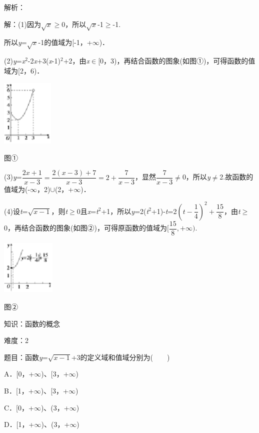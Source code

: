 \documentclass{article} %
\begin{document}
解析：

解：(1)因为$\sqrt{x}$$\mathrm{\ge}$0，所以$\sqrt{x}$-1$\mathrm{\ge}$-1.

所以\textit{y}=$\sqrt{x}$-1的值域为[-1，+$\mathrm{\infty}$)．



(2)\textit{y}=\textit{x}${}^{2}$-2\textit{x}+3(\textit{x}-1)${}^{2}$+2，由\textit{x}$\mathrm{\in}$[0，3)，再结合函数的图象(如图①)，可得函数的值域为[2，6)．

\includegraphics*[width=0.98in, height=1.27in, keepaspectratio=false]{image19}

图①

(3)\textit{y}=$\dfrac{2x+1}{x-3}=\dfrac{2(x-3)+7}{x-3}=2+\dfrac{7}{x-3}$，显然$\dfrac{7}{x-3}$$\mathrm{\neq}$0，所以\textit{y}$\mathrm{\neq}$2.故函数的值域为(-$\mathrm{\infty}$，2)$\mathrm{\cup}$(2，+$\mathrm{\infty}$)．

(4)设\textit{t}=$\sqrt{x-1}$，则\textit{t}$\mathrm{\ge}$0且\textit{x}=\textit{t}${}^{2}$+1，所以\textit{y}=2(\textit{t}${}^{2}$+1)-\textit{t}=2$(t-\dfrac{1}{4})^{2}+\dfrac{15}{8}$，由\textit{t}$\mathrm{\ge}$0，再结合函数的图象(如图②)，可得原函数的值域为$[\dfrac{15}{8},+\mathrm{\infty})$.

\includegraphics*[width=1.01in, height=1.05in, keepaspectratio=false]{image20}

图②

知识：函数的概念

难度：2

题目：函数\textit{y}=$\sqrt{x-1}$+3的定义域和值域分别为(　　)

A．[0，+$\mathrm{\infty}$)、[3，+$\mathrm{\infty}$)  

B．[1，+$\mathrm{\infty}$)、[3，+$\mathrm{\infty}$)

C．[0，+$\mathrm{\infty}$)、(3，+$\mathrm{\infty}$)  

D．[1，+$\mathrm{\infty}$)、(3，+$\mathrm{\infty}$)
\end{document}
